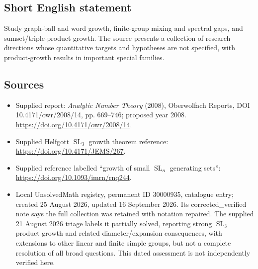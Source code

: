 \documentclass[11pt]{article}
\begin{document}
\subsection{Short English statement}
Study graph-ball and word growth, finite-group mixing and spectral gaps, and sumset/triple-product growth. The source presents a collection of research directions whose quantitative targets and hypotheses are not specified, with product-growth results in important special families.
\subsection{Sources}
\begin{itemize}
\item Supplied report: \emph{Analytic Number Theory} (2008), Oberwolfach Reports, DOI 10.4171/owr/2008/14, pp. 669--746; proposed year 2008. \url{https://doi.org/10.4171/owr/2008/14}.
\item Supplied Helfgott $\operatorname{SL}_3$ growth theorem reference: \url{https://doi.org/10.4171/JEMS/267}.
\item Supplied reference labelled ``growth of small $\operatorname{SL}_n$ generating sets'': \url{https://doi.org/10.1093/imrn/rnq244}.
\item Local UnsolvedMath registry, permanent ID 30000935, catalogue entry; created 25 August 2026, updated 16 September 2026. Its corrected\_verified note says the full collection was retained with notation repaired. The supplied 21 August 2026 triage labels it partially solved, reporting strong $\operatorname{SL}_3$ product growth and related diameter/expansion consequences, with extensions to other linear and finite simple groups, but not a complete resolution of all broad questions. This dated assessment is not independently verified here.
\end{itemize}
\end{document}
